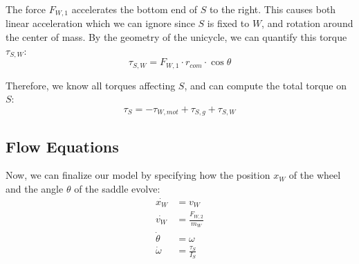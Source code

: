 \documentclass[copyright,submission]{eptcs}
\newcommand{\mi}[1]{\mathit{#1}}
\begin{document}
The force $F_{W,1}$ accelerates the bottom end of $S$ to the right. This causes both linear acceleration which we can ignore since $S$ is fixed to $W$, and rotation around the center of mass. By the geometry of the unicycle, we can quantify this torque $\tau_{S,W}$:
\begin{equation}\label{defining-tau-s-w}
    \tau_{S,W} = F_{W,1} \cdot r_\mi{com} \cdot \cos \theta
\end{equation}

Therefore, we know all torques affecting $S$, and can compute the total torque on $S$:
\begin{equation}\label{eqn:defining-tau-s}
    \tau_S = -\tau_{W, \mi{mot}} + \tau_{S, g} + \tau_{S, W}
\end{equation}


\subsection{Flow Equations}

Now, we can finalize our model by specifying how the position $x_W$ of the wheel and the angle $\theta$ of the saddle evolve:
\begin{align}
    \dot{x_W} &= v_W \label{eqn:flow-xw} \\
    \dot{v_W} &= \frac{F_{W, 2}}{m_W} \label{eqn:flow-vw} \\
    \dot{\theta} &= \omega \label{eqn:flow-theta} \\
    \dot{\omega} &= \frac{\tau_S}{I_S} \label{eqn:flow-omega}
\end{align}
\end{document}
